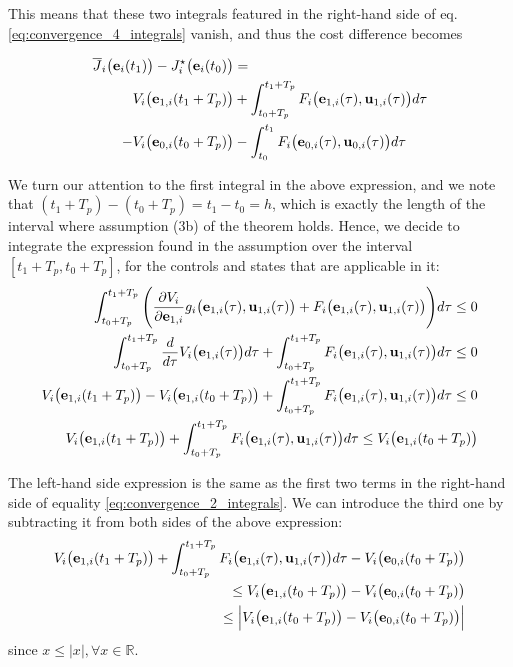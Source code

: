 This means that these two integrals featured in the right-hand side of eq.
\eqref{eq:convergence_4_integrals} vanish, and thus the cost difference becomes

\begin{align}
  \overline{J}_i\big(\bm{\mathbf{e}}_i(t_1)\big) - J_i^{\star}\big(\bm{\mathbf{e}}_i(t_0)\big) &= \\
    V_i \big(\bm{\mathbf{e}}_{1,i} (t_1 + T_p)\big)
    &+\int_{t_0 + T_p}^{t_1 + T_p} F_i \big(\bm{\mathbf{e}}_{1,i}(\tau), \bm{\mathbf{u}}_{1,i} (\tau)\big) d \tau \\
    -V_i \big(\bm{\mathbf{e}}_{0,i} (t_0 + T_p)\big)
    &-\int_{t_0}^{t_1} F_i \big(\bm{\mathbf{e}}_{0,i}(\tau), \bm{\mathbf{u}}_{0,i} (\tau)\big) d \tau
\label{eq:convergence_2_integrals}
\end{align}

\begin{gg_box}
  We turn our attention to the first integral in the above expression, and we
  note that $(t_1 + T_p) - (t_0 + T_p) = t_1 - t_0 = h$, which is exactly the
  length of the interval where assumption (3b) of the theorem holds. Hence,
  we decide to integrate the expression found in the assumption over the
  interval $[t_1 + T_p, t_0 + T_p]$, for the controls and states that are
  applicable in it:
  \begin{align}
    \int_{t_0 + T_p}^{t_1 + T_p} \Bigg(\dfrac{\partial V_i}{\partial \bm{\mathbf{e}}_{1,i}} g_i\big(\bm{\mathbf{e}}_{1,i}(\tau), \bm{\mathbf{u}}_{1,i}(\tau)\big)
    + F_i\big(\bm{\mathbf{e}}_{1,i}(\tau), \bm{\mathbf{u}}_{1,i}(\tau)\big)\Bigg) d\tau \leq 0 \\
    \int_{t_0 + T_p}^{t_1 + T_p} \dfrac{d}{d\tau} V_i\big(\bm{\mathbf{e}}_{1,i}(\tau)\big) d \tau
    + \int_{t_0 + T_p}^{t_1 + T_p} F_i\big(\bm{\mathbf{e}}_{1,i}(\tau), \bm{\mathbf{u}}_{1,i}(\tau)\big) d\tau \leq 0 \\
    V_i\big(\bm{\mathbf{e}}_{1,i}(t_1 + T_p)\big) - V_i\big(\bm{\mathbf{e}}_{1,i}(t_0 + T_p)\big)
    + \int_{t_0 + T_p}^{t_1 + T_p} F_i\big(\bm{\mathbf{e}}_{1,i}(\tau), \bm{\mathbf{u}}_{1,i}(\tau)\big) d\tau \leq 0 \\
    V_i\big(\bm{\mathbf{e}}_{1,i}(t_1 + T_p)\big)
    + \int_{t_0 + T_p}^{t_1 + T_p} F_i\big(\bm{\mathbf{e}}_{1,i}(\tau), \bm{\mathbf{u}}_{1,i}(\tau)\big) d\tau \leq V_i\big(\bm{\mathbf{e}}_{1,i}(t_0 + T_p)\big)
  \end{align}

  The left-hand side expression is the same as the first two terms in the
  right-hand side of equality \eqref{eq:convergence_2_integrals}. We can
  introduce the third one by subtracting it from both sides of the above
  expression:
  \begin{align}
    V_i\big(\bm{\mathbf{e}}_{1,i}(t_1 + T_p)\big)
    + \int_{t_0 + T_p}^{t_1 + T_p} F_i\big(\bm{\mathbf{e}}_{1,i}(\tau), \bm{\mathbf{u}}_{1,i}(\tau)\big) d\tau
    - V_i\big(\bm{\mathbf{e}}_{0,i}(t_0 + T_p)\big) \\
    \leq V_i\big(\bm{\mathbf{e}}_{1,i}(t_0 + T_p)\big)
    - V_i\big(\bm{\mathbf{e}}_{0,i}(t_0 + T_p)\big) \\
    \leq \Big|V_i\big(\bm{\mathbf{e}}_{1,i}(t_0 + T_p)\big)
    - V_i\big(\bm{\mathbf{e}}_{0,i}(t_0 + T_p)\big)\Big|
  \end{align}
  since $x \leq |x|, \forall x \in \mathbb{R}$.


\end{gg_box}
